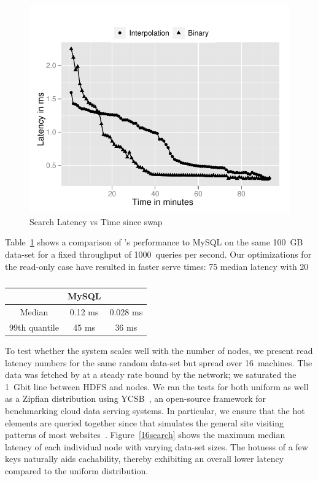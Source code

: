 \begin{figure}
  \centering
    \includegraphics[scale=0.55]{images/search_1node.pdf}
  \caption{Search Latency vs Time since swap}
  \label{search}
\end{figure}

Table~\ref{mysql:search} shows a comparison of \projectname's
performance to MySQL on the same 100~GB data-set for a fixed
throughput of 1000~queries per second. Our optimizations for the
read-only case have resulted in faster serve times: 75%
median latency with 20%

\begin{table}
\centering
\begin{tabular}{ | c | c | c |  }
\hline
                & MySQL   & \projectname{} \\ \hline
Median          & 0.12 ms & 0.028 ms       \\
99th quantile	& 45 ms   & 36 ms          \\
\hline
\end{tabular}
\caption{}
\label{mysql:search}
\end{table}

To test whether the system scales well with the number of nodes, we
present read latency numbers for the same random data-set but spread
over 16~machines. The data was fetched by \projectname{} at a steady
rate bound by the network; we saturated the 1~Gbit line between HDFS
and \projectname{} nodes. We ran the tests for both uniform as well as
a Zipfian distribution using YCSB~\cite{ycsb}, an open-source framework 
for benchmarking cloud data serving systems. In particular,
 we ensure that the hot elements are queried together since that 
simulates the general site visiting patterns of most websites~\cite{...}.
Figure~\ref{16search} shows the maximum median latency of each
individual node with varying data-set sizes. The hotness of a few keys
naturally aids cachability, thereby exhibiting an overall lower
latency compared to the uniform distribution. 

